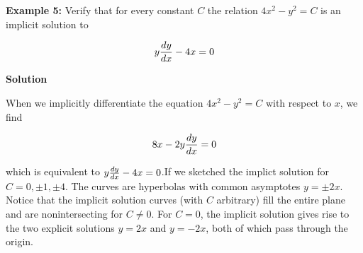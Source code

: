 \nopagenumbers
{\bf Example 5:} Verify that for every constant $C$ the relation $4x^2-y^2=C$ is an implicit solution to

$$y{dy\over dx}-4x=0$$


\vskip 10pt
{\bf Solution}

\vskip 6pt
When we implicitly differentiate the equation $4x^2-y^2=C$ with respect to $x$, we find

$$8x-2y{dy\over dx}=0$$

which is equivalent to $y{dy\over dx}-4x=0$.If we sketched the implict solution for $C=0,\pm 1,\pm 4$. The curves are hyperbolas with common asymptotes $y=\pm 2x$. Notice that the implicit solution curves (with $C$ arbitrary) fill the entire plane and are nonintersecting for $C\neq 0$. For $C=0$, the implicit solution gives rise to the two explicit solutions $y=2x$ and $y=-2x$, both of which pass through the origin.

\vfill\eject
\bye
